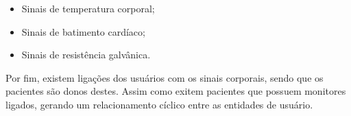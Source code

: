 \begin{itemize}
    \item Sinais de temperatura corporal;
    \item Sinais de batimento cardíaco;
    \item Sinais de resistência galvânica.
\end{itemize}

Por fim, existem ligações dos usuários com os sinais corporais, sendo que os pacientes
são donos destes. Assim como exitem pacientes que possuem monitores ligados,
gerando um relacionamento cíclico entre as entidades de usuário.
